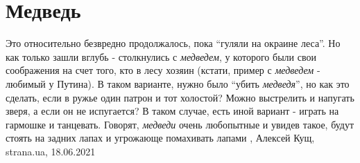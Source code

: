  
 
 
 
 
\chapter{Медведь}

Это относительно безвредно продолжалось, пока \enquote{гуляли на окраине леса}.
Но как только зашли вглубь - столкнулись с \emph{медведем}, у которого были
свои соображения на счет того, кто в лесу хозяин (кстати, пример с
\emph{медведем} - любимый у Путина).  В таком варианте, нужно было
\enquote{убить \emph{медведя}}, но как это сделать, если в ружье один патрон и
тот холостой?  Можно выстрелить и напугать зверя, а если он не испугается? В
таком случае, есть иной вариант - играть на гармошке и танцевать.  Говорят,
\emph{медведи} очень любопытные и увидев такое, будут стоять на задних лапах и
угрожающе помахивать лапами
, 
Алексей Кущ, strana.ua, 18.06.2021

